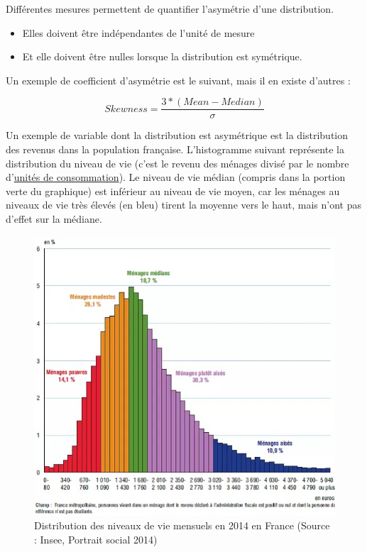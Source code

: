 \documentclass[
  french,
]{book}
\providecommand{\tightlist}{%
  \setlength{\itemsep}{0pt}\setlength{\parskip}{0pt}}
\begin{document}
Différentes mesures permettent de quantifier l'asymétrie d'une distribution.

\begin{itemize}
\tightlist
\item
  Elles doivent être indépendantes de l'unité de mesure
\item
  Et elle doivent être nulles lorsque la distribution est symétrique.
\end{itemize}

Un exemple de coefficient d'asymétrie est le suivant, mais il en existe d'autres :

\[ Skewness = \frac{3*(Mean - Median)}{\sigma} \]

Un exemple de variable dont la distribution est asymétrique est la distribution des revenus dans la population française. L'histogramme suivant représente la distribution du niveau de vie (c'est le revenu des ménages divisé par le nombre d'\href{https://www.insee.fr/fr/metadonnees/definition/c1890}{unités de consommation}). Le niveau de vie médian (compris dans la portion verte du graphique) est inférieur au niveau de vie moyen, car les ménages au niveaux de vie très élevés (en bleu) tirent la moyenne vers le haut, mais n'ont pas d'effet sur la médiane.

\begin{figure}
\centering
\includegraphics{images/salaires - copie.jpg}
\caption{Distribution des niveaux de vie mensuels en 2014 en France (Source : Insee, Portrait social 2014)}
\end{figure}
\end{document}

